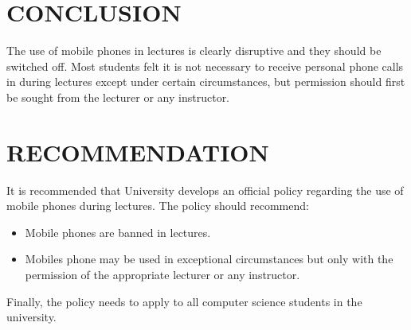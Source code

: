 \documentclass{article}
\begin{document}
\section{CONCLUSION}\label{sec:into}
The use of mobile phones in lectures is clearly disruptive and they should be
switched off. Most students felt it is not necessary to receive personal phone calls in during lectures except under certain circumstances, but permission should first be sought
from the lecturer or any instructor.



\section{RECOMMENDATION}\label{sec:into}
It is recommended that University develops an official policy regarding the use of mobile
phones during lectures. The policy should recommend:

	\begin{itemize}
   	  \item Mobile phones are banned in lectures.
	  \item Mobiles phone may be used in exceptional circumstances but only with the
permission of the appropriate lecturer or any instructor.
	\end{itemize}


Finally, the policy needs to apply to all computer science students in the university.
\end{document}
